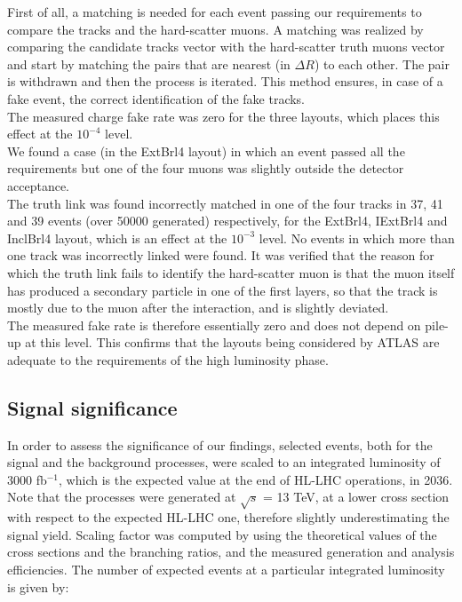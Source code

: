 \documentclass[a4paper,twoside,12pt]{book}
\begin{document}
First of all, a matching is needed for each event passing our requirements to compare 
the tracks and the hard-scatter muons. A matching was realized by comparing the candidate
tracks vector with the hard-scatter truth muons vector and start by matching the pairs
that are nearest (in $\Delta R$) to each other. The pair is withdrawn and then the process
is iterated. This method ensures, in case of a fake event, the correct
identification of the fake tracks. \\

The measured charge fake rate was zero for the three layouts, which places this
effect at the $10^{-4}$ level. \\

We found a case (in the ExtBrl4 layout) 
in which an event passed all the requirements but one of the four muons was slightly outside the detector acceptance.\\

The truth link was found incorrectly matched in one of the
four tracks in 37, 41 and 39 events (over 50000 generated) respectively, for the ExtBrl4, IExtBrl4
and InclBrl4 layout, which is an effect at the $10^{-3}$ level. No events in which more than one
track was incorrectly linked were found.  It was verified that the reason for which 
the truth link fails to identify the hard-scatter muon is that the muon itself has produced
a secondary particle in one of the first layers, so that the track is mostly due to the muon
after the interaction, and is slightly deviated.\\

The measured fake rate is therefore essentially zero and does not depend on pile-up at this level.
This confirms that the layouts being considered by ATLAS are adequate to the requirements of the high
luminosity phase.

\subsection*{Signal significance}
In order to assess the significance of our findings, selected events, both for the signal and the background processes, were
scaled to an integrated luminosity of 3000 fb$^{-1}$, which is the expected
value at the end of HL-LHC operations, in 2036. Note that the processes
were generated at $\sqrt{s}$ = 13 TeV, at a lower cross section with respect
to the expected HL-LHC one, therefore slightly underestimating the signal yield. Scaling factor was
computed by using the theoretical values of the cross sections and the branching ratios,
and the measured generation and analysis efficiencies. The number of expected
events at a particular integrated luminosity is given by: 
\end{document}
